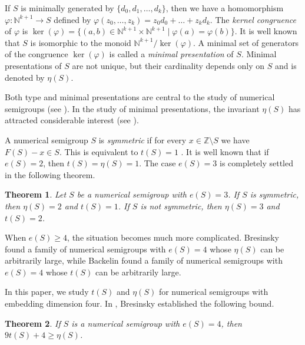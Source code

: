 \documentclass[12pt]{article}
\newtheorem{thm}{Theorem}[section]
\theoremstyle{remark}
\begin{document}
If $S$ is minimally generated by $\{d_0,d_1,\dots,d_k\}$, then we have a homomorphism $\varphi : \mathbb{N}^{k+1} \to S$ defined by $\varphi(z_0, \dots, z_k) = z_0d_0 + \dots + z_kd_k$. 
The \emph{kernel congruence} of $\varphi$ is $\ker(\varphi) = \{ (a,b) \in \mathbb{N}^{k+1} \times \mathbb{N}^{k+1} \mid \varphi(a) = \varphi(b) \}$. 
It is well known that $S$ is isomorphic to the monoid $\mathbb{N}^{k+1} / \ker(\varphi)$. A minimal set of generators of the congruence $\ker(\varphi)$ is called a \emph{minimal presentation} of $S$. Minimal presentations of $S$ are not unique, but their cardinality depends only on $S$ and is denoted by $\eta(S)$. 

Both type and minimal presentations are central to the study of numerical semigroups (see \cite{AssiDAnnaGarciaSanchez2020,BarucciDobbsFontana1997,Froberg1987,MoscarielloSammartano2025,Rosales2009}).
In the study of minimal presentations, the invariant $\eta(S)$ has attracted considerable interest (see \cite{Elmacioglu2024,MoscarielloSammartanominpresen2025,MoscarielloSammartano2025,Rosales2009,Stamate2018}). 

A numerical semigroup $S$ is \emph{symmetric} if for every $x \in \mathbb{Z} \setminus S$ we have $F(S) - x \in S$. This is equivalent to $t(S)=1$ \cite{Kunz1970}. It is well known that if $e(S)=2$, then $t(S) = \eta(S)=1$. The case $e(S)=3$ is completely settled in the following theorem.


\begin{thm}\label{theorem_embd3}
    \textup{\cite{Herzog1970}} Let $S$ be a numerical semigroup with $e(S)=3$. If $S$ is symmetric, then $\eta(S)=2$ and $t(S)=1$. If $S$ is not symmetric, then $\eta(S)=3$ and $t(S)=2$.
\end{thm}

When $e(S) \geq 4$, the situation becomes much more complicated. Bresinsky \cite{Bresinsky1975onprimeideals} found a family of numerical semigroups with $e(S) = 4$ whose $\eta(S)$ can be arbitrarily large, while Backelin \cite[p.\ 75]{Froberg1987} found a family of numerical semigroups with $e(S) = 4$ whose $t(S)$ can be arbitrarily large.

In this paper, we study $t(S)$ and $\eta(S)$ for numerical semigroups with embedding dimension four. In \cite{Bresinsky1988}, Bresinsky established the following bound.

\begin{thm}\label{theoremtypebre}
    \textup{\cite[Theorem 7]{Bresinsky1988}} If $S$ is a numerical semigroup with $e(S) = 4$, then $  9 t(S) + 4 \geq \eta(S)$.
\end{thm}
\end{document}
